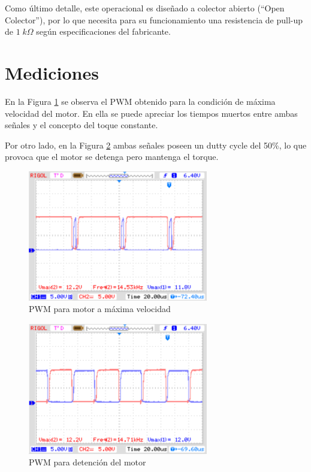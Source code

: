 \documentclass[11pt, a4paper]{article}
\begin{document}
Como último detalle, este operacional es diseñado a colector abierto (“Open Colector”), por lo que necesita para
su funcionamiento una resistencia de pull-up de $1 \; k\Omega$ según especificaciones del fabricante.

\clearpage

\section{Mediciones}

En la Figura \ref{fig:osc_max} se observa el PWM obtenido para la condición de máxima velocidad del motor. En ella se puede apreciar los tiempos muertos entre ambas señales y el concepto del toque constante. 

Por otro lado, en la Figura \ref{fig:osc_min} ambas señales poseen un dutty cycle del 50\%, lo que provoca que el motor se detenga pero mantenga el torque.

\begin{figure}[h!]
	\centering
	\includegraphics[width=0.7\textwidth]{Imagenes/osc_max.png}
	\caption{PWM para motor a máxima velocidad}
	\label{fig:osc_max}
\end{figure} 

\begin{figure}[h!]
	\centering
	\includegraphics[width=0.7\textwidth]{Imagenes/osc_min.png}
	\caption{PWM para detención del motor}
	\label{fig:osc_min}
\end{figure} 
\end{document}
